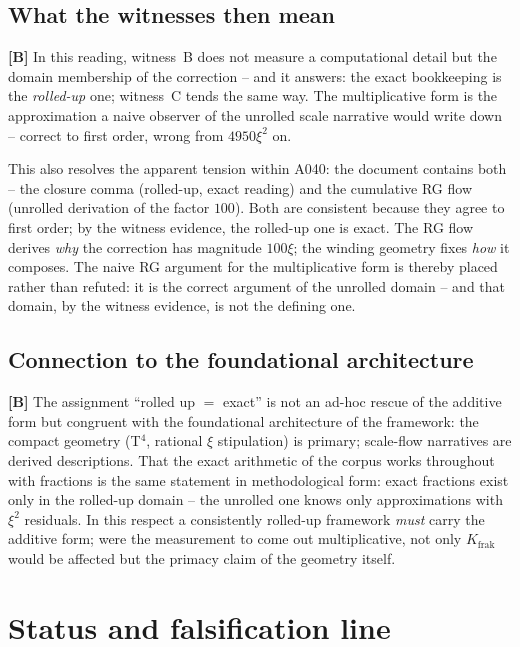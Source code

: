 \subsection{What the witnesses then mean}

\textbf{[B]} In this reading, witness~B does not measure a
computational detail but the domain membership of the correction --
and it answers: the exact bookkeeping is the
\emph{rolled-up} one; witness~C tends the same way. The multiplicative form is the approximation a
naive observer of the unrolled scale narrative would write down --
correct to first order, wrong from $4950\xi^2$ on.

This also resolves the apparent tension within A040: the document
contains both -- the closure comma (rolled-up, exact reading) and the
cumulative RG flow (unrolled derivation of the factor $100$). Both
are consistent because they agree to first order; by the witness
evidence, the rolled-up one is exact. The RG flow derives \emph{why}
the correction has magnitude $100\xi$; the winding geometry fixes
\emph{how} it composes. The naive RG argument for the multiplicative
form is thereby placed rather than refuted: it is the correct
argument of the unrolled domain -- and that domain, by the witness
evidence, is not the defining one.

\subsection{Connection to the foundational architecture}

\textbf{[B]} The assignment \enquote{rolled up $=$ exact} is not an
ad-hoc rescue of the additive form but congruent with the
foundational architecture of the framework: the compact geometry
(T$^4$, rational $\xi$ stipulation) is primary; scale-flow narratives
are derived descriptions. That the exact arithmetic of the corpus
works throughout with fractions is the same statement in
methodological form: exact fractions exist only in the rolled-up
domain -- the unrolled one knows only approximations with $\xi^2$
residuals. In this respect a consistently rolled-up framework
\emph{must} carry the additive form; were the measurement to come out
multiplicative, not only $K_\text{frak}$ would be affected but the
primacy claim of the geometry itself.

\section{Status and falsification line}

